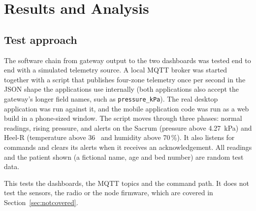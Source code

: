 \clearpage
\section{Results and Analysis}
\label{sec:results}

\subsection{Test approach}
The software chain from gateway output to the two dashboards was tested end to end with a simulated telemetry source. A local MQTT broker was started together with a script that publishes four-zone telemetry once per second in the JSON shape the applications use internally (both applications also accept the gateway's longer field names, such as \texttt{pressure\_kPa}). The real desktop application was run against it, and the mobile application code was run as a web build in a phone-sized window. The script moves through three phases: normal readings, rising pressure, and alerts on the Sacrum (pressure above 4.27~kPa) and Heel-R (temperature above 36~\degC{} and humidity above 70\,\%). It also listens for commands and clears its alerts when it receives an acknowledgement. All readings and the patient shown (a fictional name, age and bed number) are random test data.

This tests the dashboards, the MQTT topics and the command path. It does not test the sensors, the radio or the node firmware, which are covered in Section~\ref{sec:notcovered}.

